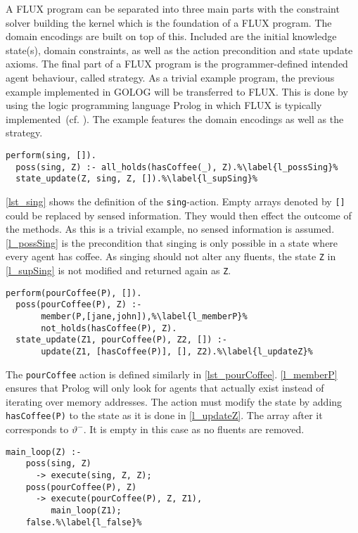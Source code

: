 A FLUX program can be separated into three main parts with the constraint solver building the kernel which is the foundation of a FLUX program.
The domain encodings are built on top of this.
Included are the initial knowledge state(s), domain constraints, as well as the action precondition and state update axioms.
The final part of a FLUX program is the programmer-defined intended agent behaviour, called strategy.
As a trivial example program, the previous example implemented in GOLOG will be transferred to FLUX.
This is done by using the logic programming language Prolog in which FLUX is typically implemented~(cf. \cite{thielscher_reasoning_2006,martin_addressing_2001}). %
The example features the domain encodings as well as the strategy.
\begin{lstlisting}[caption={Defintion of the \texttt{sing}-action.}, label=lst_sing]
  perform(sing, []).
  poss(sing, Z) :- all_holds(hasCoffee(_), Z).%\label{l_possSing}%
  state_update(Z, sing, Z, []).%\label{l_supSing}%
\end{lstlisting}
\autoref{lst_sing} shows the definition of the \texttt{sing}-action.
Empty arrays denoted by \texttt{[]} could be replaced by sensed information.
They would then effect the outcome of the methods.
As this is a trivial example, no sensed information is assumed.
\autoref{l_possSing} is the precondition that singing is only possible in a state where every agent has coffee.
As singing should not alter any fluents, the state \texttt{Z} in \autoref{l_supSing} is not modified and returned again as \texttt{Z}.
\begin{lstlisting}[firstnumber=4, caption={Definition of the \texttt{pourCoffee}-action}, label=lst_pourCoffee]
  perform(pourCoffee(P), []).
  poss(pourCoffee(P), Z) :-
       member(P,[jane,john]),%\label{l_memberP}%
       not_holds(hasCoffee(P), Z).
  state_update(Z1, pourCoffee(P), Z2, []) :-
       update(Z1, [hasCoffee(P)], [], Z2).%\label{l_updateZ}%
\end{lstlisting}
The \texttt{pourCoffee} action is defined similarly in \autoref{lst_pourCoffee}.
\autoref{l_memberP} ensures that Prolog will only look for agents that actually exist instead of iterating over memory addresses.
The action must modify the state by adding \texttt{hasCoffee(P)} to the state as it is done in \autoref{l_updateZ}.
The array after it corresponds to $\vartheta^-$.
It is empty in this case as no fluents are removed.
\begin{lstlisting}[firstnumber=10, caption={Main method which either tells the robot to sing or to pour coffee.}, label=lst_main]
  main_loop(Z) :-
    poss(sing, Z)
      -> execute(sing, Z, Z);
    poss(pourCoffee(P), Z)
      -> execute(pourCoffee(P), Z, Z1),
         main_loop(Z1);
    false.%\label{l_false}%
\end{lstlisting}
